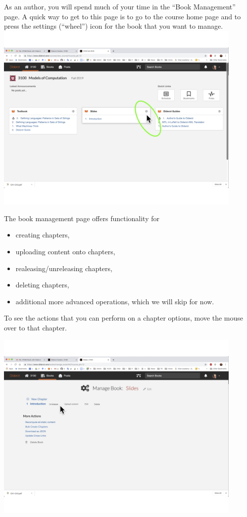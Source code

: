 \begin{gram}
\label{guide::author::go-book-management}
As an author, you will spend much of your time in the ``Book Management'' page.
A quick way to get to this page is to go to the course home page and to press the settings (``wheel'') icon for the book that you want to manage.
%
\includegraphics[width=0.9\textwidth]{staff/media/go-to-book-management.jpg}
\end{gram}


\begin{gram}
The book management page offers functionality for
\begin{itemize}
\item creating chapters,
\item uploading content onto chapters,
\item realeasing/unreleasing chapters,
\item deleting chapters,
\item additional more advanced operations, which we will skip for now.
\end{itemize}

To see the actions that you can perform on a chapter options, move the mouse over to that chapter. 

\includegraphics[width=0.9\textwidth]{staff/media/book-management.jpg}
\end{gram}

